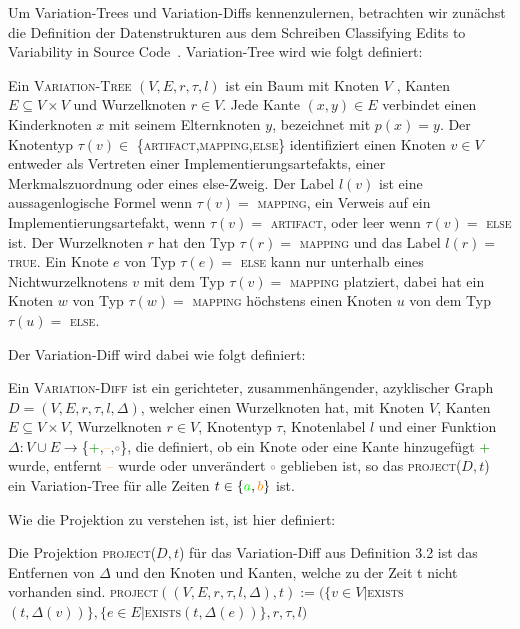 Um Variation-Trees und Variation-Diffs kennenzulernen, betrachten wir zunächst die Definition der Datenstrukturen aus dem Schreiben Classifying Edits to Variability in Source Code~\cite{BTS+:ESECFSE22}.
 Variation-Tree wird wie folgt definiert:
\begin{definition}
	Ein \textsc{Variation-Tree}  $(V,E,r,\tau,l)$ ist ein Baum mit Knoten $V$ , Kanten $E \subseteq V \times V$ und Wurzelknoten $r \in V$. Jede Kante $(x,y) \in E$ verbindet einen Kinderknoten $x$ mit seinem Elternknoten $y$, bezeichnet mit $p(x) = y$. Der Knotentyp $\tau(v) \in $ \{\textsc{artifact,mapping,else}\} identifiziert einen Knoten $v \in V$ entweder als Vertreten einer Implementierungsartefakts, einer Merkmalszuordnung oder eines else-Zweig. Der Label $l(v)$ ist eine aussagenlogische Formel wenn $\tau(v) =$ \textsc{mapping}, ein Verweis auf ein Implementierungsartefakt, wenn $\tau(v) = $ \textsc{artifact}, oder leer wenn $\tau(v) =$ \textsc{else} ist. Der Wurzelknoten $r$ hat den Typ $\tau(r) =$ \textsc{mapping} und das Label $l(r) = $ \textsc{true}. Ein Knote $e$ von Typ $\tau(e) =$ \textsc{else} kann nur unterhalb eines Nichtwurzelknotens $v$ mit dem Typ $\tau(v) =$ \textsc{mapping} platziert, dabei hat ein Knoten $w$ von Typ $\tau(w) =$ \textsc{mapping} höchstens einen Knoten $u$ von dem Typ $\tau(u) =$ \textsc{else}.
\end{definition}
Der Variation-Diff wird dabei wie folgt definiert:
\begin{definition}
	Ein \textsc{Variation-Diff} ist ein gerichteter, zusammenhängender, azyklischer Graph $D=(V,E,r,\tau,l,\Delta) $, welcher einen Wurzelknoten hat, mit Knoten $V$, Kanten $E \subseteq V \times V$, Wurzelknoten $r \in V$, Knotentyp $\tau$, Knotenlabel $l$ und einer Funktion $\Delta : V \cup E \to $\{\textcolor{green}{+},\textcolor{orange}{--},\textcolor{gray}{$\circ$}\}, die definiert, ob ein Knote oder eine Kante hinzugefügt \textcolor{green}{+} wurde, entfernt \textcolor{orange}{--} wurde oder unverändert \textcolor{gray}{$\circ$} geblieben ist, so das \textsc{project}($D,t$) ein Variation-Tree für alle Zeiten $t \in \{\textcolor{green}{a},\textcolor{orange}{b}\}$ ist.
\end{definition}
Wie die Projektion zu verstehen ist, ist hier definiert:
\begin{definition}
	Die Projektion \textsc{project}($D,t$) für das Variation-Diff aus Definition 3.2 ist das Entfernen von $\Delta$ und den Knoten und Kanten, welche zu der Zeit t nicht vorhanden sind. \textsc{project}$((V,E,r,\tau,l,\Delta),t) := (\{v \in V | $\textsc{exists}$(t,\Delta(v))\},\{e \in E | $\textsc{exists}$(t,\Delta(e))\},r,\tau,l)$
\end{definition}
